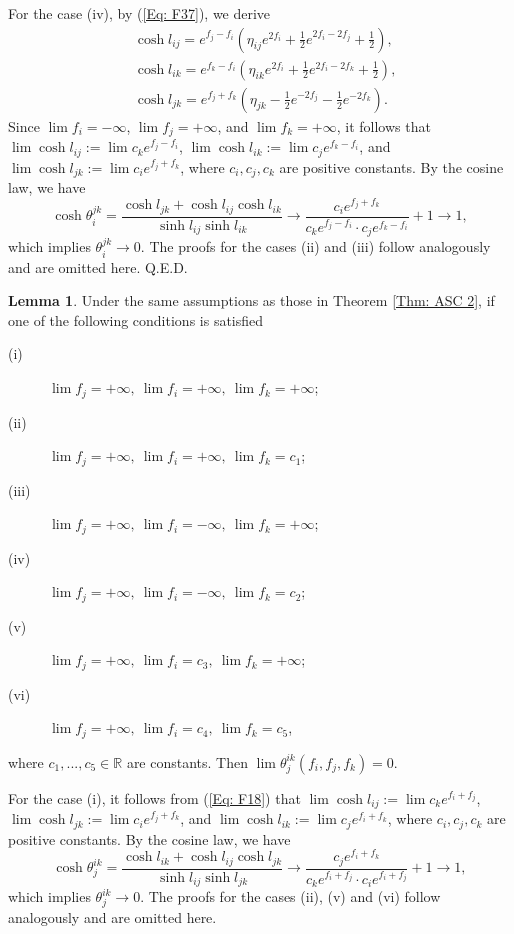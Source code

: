 \documentclass[12pt]{amsart}
\theoremstyle{definition}
\newtheorem{lemma}[theorem]{Lemma}
\def\qed{\hfill{Q.E.D.}\smallskip}
\begin{document}
For the case (iv), by (\ref{Eq: F37}), we derive
\begin{equation}\label{Eq: F19}
\begin{aligned}
&\cosh l_{ij}=e^{f_j-f_i}(\eta_{ij}e^{2f_i}
+\frac{1}{2}e^{2f_i-2f_j}+\frac{1}{2}),\\
&\cosh l_{ik}
=e^{f_k-f_i}(\eta_{ik}e^{2f_i}
+\frac{1}{2}e^{2f_i-2f_k}+\frac{1}{2}),\\
&\cosh l_{jk}
=e^{f_j+f_k}(\eta_{jk}-\frac{1}{2}e^{-2f_j}
-\frac{1}{2}e^{-2f_k}).
\end{aligned}
\end{equation}
Since $\lim f_i=-\infty$, $\lim f_j=+\infty$, and $\lim f_k=+\infty$,
it follows that $\lim\cosh l_{ij}:=\lim c_ke^{f_j-f_i}$, $\lim\cosh l_{ik}:=\lim c_je^{f_k-f_i}$, and $\lim\cosh l_{jk}:=\lim c_ie^{f_j+f_k}$,
where $c_i, c_j, c_k$ are positive constants.
By the cosine law, we have
\begin{equation*}
\cosh \theta^{jk}_i=\frac{\cosh l_{jk}+\cosh l_{ij}\cosh l_{ik}}{\sinh l_{ij}\sinh l_{ik}}\rightarrow
\frac{c_ie^{f_j+f_k}}{c_ke^{f_j-f_i}\cdot c_je^{f_k-f_i}}+1
\rightarrow 1,
\end{equation*}
which implies $\theta^{jk}_i\rightarrow 0$.
The proofs for the cases (ii) and (iii) follow analogously and are omitted here.
\qed

\begin{lemma}\label{Lem: limit c2}
Under the same assumptions as those in Theorem \ref{Thm: ASC 2},
if one of the following conditions is satisfied
\begin{description}
\item[(i)] $\lim f_j=+\infty,\ \lim f_i=+\infty,\ \lim f_k=+\infty$;
\item[(ii)] $\lim f_j=+\infty,\ \lim f_i=+\infty,\ \lim f_k=c_1$;
\item[(iii)] $\lim f_j=+\infty,\ \lim f_i=-\infty,\ \lim f_k=+\infty$;
\item[(iv)] $\lim f_j=+\infty,\ \lim f_i=-\infty,\ \lim f_k=c_2$;
\item[(v)] $\lim f_j=+\infty,\ \lim f_i=c_3,\ \lim f_k=+\infty$;
\item[(vi)] $\lim f_j=+\infty,\ \lim f_i=c_4,\ \lim f_k=c_5$,
\end{description}
where $c_1,...,c_5\in \mathbb{R}$ are constants.
Then $\lim\theta^{ik}_j(f_i,f_j,f_k)=0$.
\end{lemma}
\proof
For the case (i), it follows from (\ref{Eq: F18}) that $\lim\cosh l_{ij}:=\lim c_ke^{f_i+f_j}$,\ $\lim\cosh l_{jk}:=\lim c_ie^{f_j+f_k}$, and $\lim\cosh l_{ik}:=\lim c_je^{f_i+f_k}$, where $c_i, c_j, c_k$ are positive constants.
By the cosine law, we have
\begin{equation*}
\cosh \theta^{ik}_j=\frac{\cosh l_{ik}+\cosh l_{ij}\cosh l_{jk}}{\sinh l_{ij}\sinh l_{jk}}\rightarrow
\frac{c_je^{f_i+f_k}}{c_ke^{f_i+f_j}\cdot c_ie^{f_i+f_j}}+1
\rightarrow 1,
\end{equation*}
which implies $\theta^{ik}_j\rightarrow 0$.
The proofs for the cases (ii), (v) and (vi) follow analogously and are omitted here.
\end{document}
